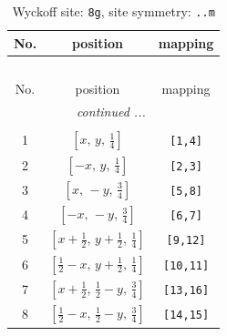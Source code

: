 \documentclass[fleqn,8pt]{jsarticle}
\begin{document}
\begin{longtable}{ccc}
\caption{Wyckoff site: {\tt 8g}, site symmetry: {\tt ..m}}
 \\
 \hline \hline
No. & position & mapping \\ \hline \endfirsthead

\multicolumn{2}{l}{\tablename\ \thetable{}} \\
 \hline \hline
No. & position & mapping \\ \hline \endhead

 \hline \hline
\multicolumn{2}{r}{\footnotesize\it continued ...} \\ \endfoot

 \hline \hline
\multicolumn{2}{r}{} \\ \endlastfoot

1 & $\left[ x,\, y,\, \frac{1}{4} \right]$ & {\tt [1,4]} \\ \hline
2 & $\left[ - x,\, y,\, \frac{1}{4} \right]$ & {\tt [2,3]} \\ \hline
3 & $\left[ x,\, - y,\, \frac{3}{4} \right]$ & {\tt [5,8]} \\ \hline
4 & $\left[ - x,\, - y,\, \frac{3}{4} \right]$ & {\tt [6,7]} \\ \hline
5 & $\left[ x + \frac{1}{2},\, y + \frac{1}{2},\, \frac{1}{4} \right]$ & {\tt [9,12]} \\ \hline
6 & $\left[ \frac{1}{2} - x,\, y + \frac{1}{2},\, \frac{1}{4} \right]$ & {\tt [10,11]} \\ \hline
7 & $\left[ x + \frac{1}{2},\, \frac{1}{2} - y,\, \frac{3}{4} \right]$ & {\tt [13,16]} \\ \hline
8 & $\left[ \frac{1}{2} - x,\, \frac{1}{2} - y,\, \frac{3}{4} \right]$ & {\tt [14,15]} \\
\end{longtable}
\renewcommand{\arraystretch}{1.2}
\end{document}
